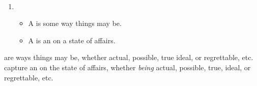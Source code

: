 \begin{note}
  \begin{definition}
    \label{def:prop-val}
    \mbox{ }%
    \vspace{-\baselineskip}
    \begin{enumerate}[noitemsep, label=]
    \item
      \begin{itemize}
      \item
        A \emph{} is some way things may be.
      \item
        A \emph{} is an \agpe{} on a state of affairs.
      \end{itemize}
    \end{enumerate}
    \vspace{-\baselineskip}
  \end{definition}

  \noindent%
   are ways things may be, whether actual, possible, true ideal, or regrettable, etc.
   capture an \agpe{} on the state of affairs, whether \emph{being} actual, possible, true, ideal, or regrettable, etc.
\end{note}

\paragraph*{}

